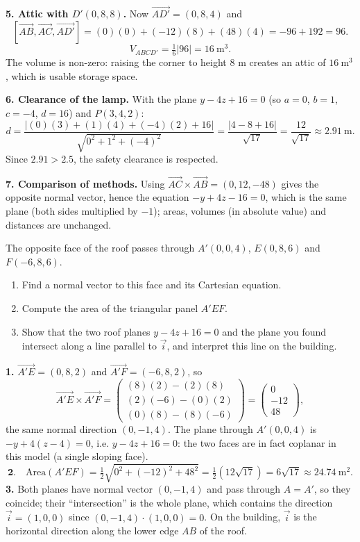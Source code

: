 \documentclass[11pt]{article}
\begin{document}
\textbf{5. Attic with $D'(0,8,8)$.} Now $\vec{AD'}=(0,8,4)$ and
\[
[\vec{AB},\vec{AC},\vec{AD'}]=(0)(0)+(-12)(8)+(48)(4)=-96+192=96.
\]
\[
V_{ABCD'}=\tfrac16|96|=16\ \mathrm{m^3}.
\]
The volume is non-zero: raising the corner to height $8$ m creates an attic of $16\ \mathrm{m^3}$, which is usable storage space.

\textbf{6. Clearance of the lamp.} With the plane $y-4z+16=0$ (so $a=0$, $b=1$, $c=-4$, $d=16$) and $P(3,4,2)$:
\[
d=\frac{|(0)(3)+(1)(4)+(-4)(2)+16|}{\sqrt{0^2+1^2+(-4)^2}}=\frac{|4-8+16|}{\sqrt{17}}=\frac{12}{\sqrt{17}}\approx 2.91\ \mathrm{m}.
\]
Since $2.91 > 2.5$, the safety clearance is respected.

\textbf{7. Comparison of methods.} Using $\vec{AC}\times\vec{AB}=(0,12,-48)$ gives the opposite normal vector, hence the equation $-y+4z-16=0$, which is the same plane (both sides multiplied by $-1$); areas, volumes (in absolute value) and distances are unchanged.

\begin{exercice}
The opposite face of the roof passes through $A'(0,0,4)$, $E(0,8,6)$ and $F(-6,8,6)$.
\begin{enumerate}
\item Find a normal vector to this face and its Cartesian equation.
\item Compute the area of the triangular panel $A'EF$.
\item Show that the two roof planes $y-4z+16=0$ and the plane you found intersect along a line parallel to $\vec{i}$, and interpret this line on the building.
\end{enumerate}
\end{exercice}

\begin{corrige}
\textbf{1.} $\vec{A'E}=(0,8,2)$ and $\vec{A'F}=(-6,8,2)$, so
\[
\vec{A'E}\times\vec{A'F}=
\begin{pmatrix} (8)(2)-(2)(8) \\ (2)(-6)-(0)(2) \\ (0)(8)-(8)(-6) \end{pmatrix}
=
\begin{pmatrix} 0 \\ -12 \\ 48 \end{pmatrix},
\]
the same normal direction $(0,-1,4)$. The plane through $A'(0,0,4)$ is $-y+4(z-4)=0$, i.e. $y-4z+16=0$: the two faces are in fact coplanar in this model (a single sloping face).
\[
\textbf{2.}\quad \text{Area}(A'EF)=\tfrac12\sqrt{0^2+(-12)^2+48^2}=\tfrac12(12\sqrt{17})=6\sqrt{17}\approx 24.74\ \mathrm{m^2}.
\]
\textbf{3.} Both planes have normal vector $(0,-1,4)$ and pass through $A=A'$, so they coincide; their ``intersection'' is the whole plane, which contains the direction $\vec{i}=(1,0,0)$ since $(0,-1,4)\cdot(1,0,0)=0$. On the building, $\vec{i}$ is the horizontal direction along the lower edge $AB$ of the roof.
\end{corrige}
\end{document}
